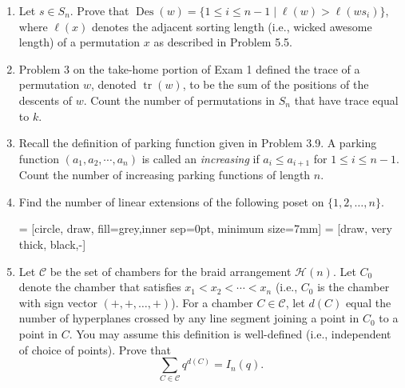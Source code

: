 \documentclass[11pt]{scrartcl}
\theoremstyle{definition}
\newcommand{\tr}{\operatorname{tr}}
\newcommand{\Des}{\operatorname{Des}}
\begin{document}
\begin{enumerate}

\item Let $s\in S_n$. Prove that $\Des(w)=\{1\leq i\leq n-1\mid \ell(w)>\ell(ws_i)\}$, where $\ell(x)$ denotes the adjacent sorting length (i.e., wicked awesome length) of a permutation $x$ as described in Problem 5.5.

\item Problem 3 on the take-home portion of Exam 1 defined the trace of a permutation $w$, denoted $\tr(w)$, to be the sum of the positions of the descents of $w$. Count the number of permutations in $S_n$ that have trace equal to $k$.

\item Recall the definition of parking function given in Problem 3.9.  A parking function $(a_1,a_2,\cdots,a_n)$ is called an \emph{increasing} if $a_i\leq a_{i+1}$ for $1\leq i\leq n-1$. Count the number of increasing parking functions of length $n$.

\item Find the number of linear extensions of the following poset on $\{1,2,\ldots,n\}$.

\bigskip

 = [circle, draw, fill=grey,inner sep=0pt, minimum size=7mm]
 = [draw, very thick, black,-]

\begin{center}
\end{center}

\item Let $\mathcal{C}$ be the set of chambers for the braid arrangement $\mathcal{H}(n)$.  Let $C_0$ denote the chamber that satisfies $x_1<x_2<\cdots <x_n$ (i.e., $C_0$ is the chamber with sign vector $(+,+,\ldots,+)$). For a chamber $C\in\mathcal{C}$, let $d(C)$ equal the number of hyperplanes crossed by any line segment joining a point in $C_0$ to a point in $C$.  You may assume this definition is well-defined (i.e., independent of choice of points). Prove that
\[
\sum_{C\in \mathcal{C}}q^{d(C)}=I_n(q).
\]


\end{enumerate}
\end{document}
